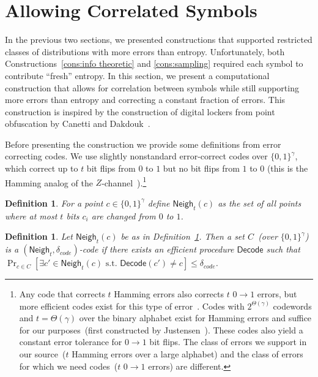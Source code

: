 \documentclass[11pt]{article}
\newcommand{\defref}[1]{\mbox{Definition~\ref{#1}}}
\newcommand{\class}[1]{{\ensuremath{\mathsf{#1}}}}
\newcommand{\zo}{\ensuremath{\{0, 1\}}}
\newcommand{\neigh}{\ensuremath{\class{Neigh}}\xspace}
\newcommand{\decode}{\ensuremath{\mathsf{Decode}}}
\newtheorem{definition}[theorem]{Definition}
\begin{document}
\section{Allowing Correlated Symbols}
\label{sec:cor construction}
In the previous two sections, we presented constructions that supported restricted classes of distributions with more errors than entropy.  Unfortunately, both Constructions~\ref{cons:info theoretic} and \ref{cons:sampling} required each symbol to contribute ``fresh'' entropy.  In this section, we present a computational construction that allows for correlation between symbols while still supporting more errors than entropy and correcting a constant fraction of errors.
This construction is inspired by the construction of digital lockers from point obfuscation by Canetti and Dakdouk~\cite{canetti2008obfuscating}.  

Before presenting the construction we provide some definitions from error correcting codes.
We use slightly nonstandard error-correct codes over $\{0,1\}^\gamma$, which correct up to $t$ bit flips from $0$ to $1$ but no bit flips from $1$ to $0$ (this is the Hamming analog of the $Z$-channel~\cite{tallini2002capacity}).\footnote{Any code that corrects $t$ Hamming errors also corrects $t$ $0\rightarrow 1$ errors, but more efficient codes  exist for this type of error~\cite{tallini2002capacity}.
Codes with $2^{\Theta(\gamma)}$ codewords and $t = \Theta(\gamma)$ over the binary alphabet exist for Hamming errors and suffice for our purposes~(first constructed by Justensen~\cite{justesen1972class}).  These codes also yield a constant error tolerance for $0\rightarrow 1$ bit flips.
The class of errors we support in our source~($t$ Hamming errors over a large alphabet) and the class of errors for which we need codes~($t$ $0\rightarrow 1$ errors) are different.  
}
\begin{definition}
\label{def:hamming z channel}
For a point $c\in \zo^\gamma$ define $\neigh_t(c) $ as the set of all points where at most $t$ bits $c_i$ are changed from $0$ to $1$.
\end{definition}

\begin{definition}
Let $\neigh_t(c)$ be as in \defref{def:hamming z channel}.  Then a set $C$~(over $\zo^\gamma$) is a $(\neigh_t, \delta_{code})$-code if there exists an efficient procedure $\decode$ such that $\Pr_{c\in C}[\exists c'\in \neigh_t(c) \text{ s.t. } \decode(c') \neq c] \leq \delta_{code}$.
\end{definition}
\end{document}
